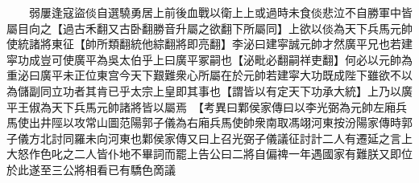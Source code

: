 　　弱屢逢寇盜倓自選驍勇居上前後血戰以衛上上或過時未食倓悲泣不自勝軍中皆屬目向之【過古禾翻又古卧翻勝音升屬之欲翻下所屬同】上欲以倓為天下兵馬元帥使統諸將東征【帥所類翻統他綜翻將即亮翻】李泌曰建寜誠元帥才然廣平兄也若建寜功成豈可使廣平為吳太伯乎上曰廣平冢嗣也【泌毗必翻嗣祥吏翻】何必以元帥為重泌曰廣平未正位東宫今天下艱難衆心所屬在於元帥若建寜大功既成陛下雖欲不以為儲副同立功者其肯已乎太宗上皇即其事也【謂皆以有定天下功承大統】上乃以廣平王俶為天下兵馬元帥諸將皆以屬焉　【考異曰鄴侯家傳曰以李光弼為元帥左廂兵馬使出井陘以攻常山圖范陽郭子儀為右廂兵馬使帥衆南取馮翊河東按汾陽家傳時郭子儀方北討同羅未向河東也鄴侯家傳又曰上召光弼子儀議征討計二人有遷延之言上大怒作色叱之二人皆仆地不畢詞而罷上告公曰二將自偏禆一年遇國家有難朕又即位於此遂至三公將相看已有驕色啇議